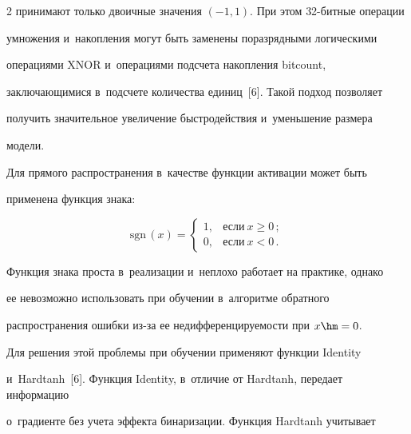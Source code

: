 \begin{multicols}{2}
принимают только двоичные значения $(-1, 1)$. При этом 32-бит\-ные операции 


умножения и~на\-коп\-ле\-ния могут быть заменены поразрядными логическими 


операциями XNOR и~операциями под\-сче\-та накопления bitcount, 


за\-клю\-ча\-ющи\-ми\-ся в~подсчете количества единиц~[6]. Такой подход поз\-во\-ля\-ет 


получить значительное увеличение быст\-ро\-дей\-ст\-вия и~уменьшение размера 


мо\-дели.


  


  Для прямого распространения в~качестве функции активации может быть 


применена функ\-ция \mbox{знака}:





\noindent


  \begin{equation*}


  \mathrm{sgn}\,(x)= \begin{cases}


  1, &\mbox{если}\ x\geq 0\,;\\


  0, & \mbox{если}\ x<0\,.


  \end{cases}




  \end{equation*}


  


  Функция знака прос\-та в~реализации и~неплохо работает на прак\-ти\-ке, однако 


ее не\-воз\-мож\-но использовать при обуче\-нии в~алгоритме обрат\-но\-го 


рас\-про\-стра\-не\-ния ошиб\-ки из-за ее не\-диф\-фе\-рен\-ци\-ру\-емости при $x\hm = 0$.


  


  Для решения этой проб\-ле\-мы при обуче\-нии применяют функции Identity 


и~Hardtanh~[6]. Функция Identity, в~отличие от Hardtanh, передает информацию 


о~градиенте без учета эффекта бинаризации. Функция Hardtanh учитывает 



\end{multicols}

